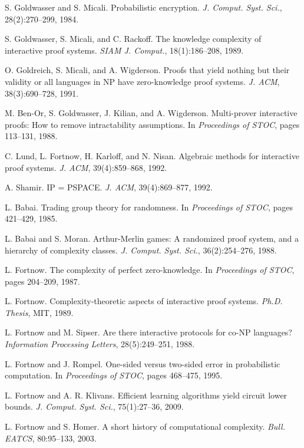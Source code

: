 \documentclass[11pt]{article}
\theoremstyle{definition}
\begin{document}
\begin{thebibliography}{99}
 S. Goldwasser and S. Micali. Probabilistic encryption. \emph{J. Comput. Syst. Sci.}, 28(2):270--299, 1984.

 S. Goldwasser, S. Micali, and C. Rackoff. The knowledge complexity of interactive proof systems. \emph{SIAM J. Comput.}, 18(1):186--208, 1989.

 O. Goldreich, S. Micali, and A. Wigderson. Proofs that yield nothing but their validity or all languages in NP have zero-knowledge proof systems. \emph{J. ACM}, 38(3):690--728, 1991.

 M. Ben-Or, S. Goldwasser, J. Kilian, and A. Wigderson. Multi-prover interactive proofs: How to remove intractability assumptions. In \emph{Proceedings of STOC}, pages 113--131, 1988.

 C. Lund, L. Fortnow, H. Karloff, and N. Nisan. Algebraic methods for interactive proof systems. \emph{J. ACM}, 39(4):859--868, 1992.

 A. Shamir. IP = PSPACE. \emph{J. ACM}, 39(4):869--877, 1992.

 L. Babai. Trading group theory for randomness. In \emph{Proceedings of STOC}, pages 421--429, 1985.

 L. Babai and S. Moran. Arthur-Merlin games: A randomized proof system, and a hierarchy of complexity classes. \emph{J. Comput. Syst. Sci.}, 36(2):254--276, 1988.

 L. Fortnow. The complexity of perfect zero-knowledge. In \emph{Proceedings of STOC}, pages 204--209, 1987.

 L. Fortnow. Complexity-theoretic aspects of interactive proof systems. \emph{Ph.D. Thesis}, MIT, 1989.

 L. Fortnow and M. Sipser. Are there interactive protocols for co-NP languages? \emph{Information Processing Letters}, 28(5):249--251, 1988.

 L. Fortnow and J. Rompel. One-sided versus two-sided error in probabilistic computation. In \emph{Proceedings of STOC}, pages 468--475, 1995.

 L. Fortnow and A. R. Klivans. Efficient learning algorithms yield circuit lower bounds. \emph{J. Comput. Syst. Sci.}, 75(1):27--36, 2009.

 L. Fortnow and S. Homer. A short history of computational complexity. \emph{Bull. EATCS}, 80:95--133, 2003.


\end{thebibliography}
\end{document}

